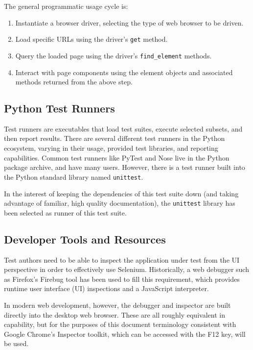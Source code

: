 The general programmatic usage cycle is:
\begin{enumerate}
\item Instantiate a browser driver, selecting the type of web browser to be driven.
\item Load specific URLs using the driver's \texttt{get} method.
\item Query the loaded page using the driver's \texttt{find\_element} methods.
\item Interact with page components using the element objects and associated methods returned from the above step.
\end{enumerate}\citep{artzi2011framework}

\subsection{Python Test Runners}
Test runners are executables that load test suites, execute selected subsets, and then report results. There are several different test runners in the Python ecosystem, varying in their usage, provided test libraries, and reporting capabilities. \citep{nielsen2014python} Common test runners like PyTest and Nose live in the Python package archive, and have many users. However, there is a test runner built into the Python standard library named \texttt{unittest}.\citep{pajankar2017python}

In the interest of keeping the dependencies of this test suite down (and taking advantage of familiar, high quality documentation), the \texttt{unittest} library has been selected as runner of this test suite.

\subsection{Developer Tools and Resources}
Test authors need to be able to inspect the application under test from the UI perspective in order to effectively use Selenium. Historically, a web debugger such as Firefox's Firebug tool has been used to fill this requirement, which provides runtime user interface (UI) inspections and a JavaScript interpreter.\citep{nicholus2016understanding}

In modern web development, however, the debugger and inspector are built directly into the desktop web browser.\citep{odell2014browser} These are all roughly equivalent in capability, but for the purposes of this document terminology consistent with Google Chrome's Inspector toolkit, which can be accessed with the F12 key, will be used.

